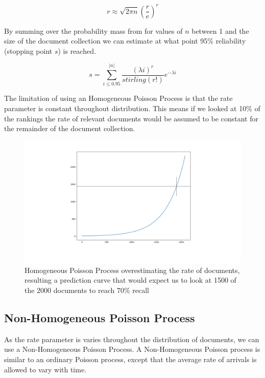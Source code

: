 \begin{equation}
	   r \approx \sqrt{2\pi n} \left( \frac{r}{e} \right) ^r
\end{equation}

By summing over the probability mass from for values of $n$ between 1 and the size of the document collection we can estimate at what point 95\% reliability (stopping point $s$) is reached. 

\begin{equation}
	   s = \sum_{i \leq 0.95}^{|n|} \frac{(\lambda i)^r}{stirling(r!)} e ^ {-\lambda i}
\end{equation}

The limitation of using an Homogeneous Poisson Process is that the rate parameter is constant throughout distribution. This means if we looked at 10\% of the rankings the rate of relevant documents would be assumed to be constant for the remainder of the document collection.


\begin{figure}[H]
\center
\includegraphics[width=16cm]{figures/overestimate.png}
\caption{Homogeneous Poisson Process overestimating the rate of documents, resulting a prediction curve that would expect us to look at 1500 of the 2000 documents to reach 70\% recall}
\end{figure}

\subsection{Non-Homogeneous Poisson Process}

As the rate parameter is varies throughout the distribution of documents, we can use a Non-Homogeneous Poisson Process. A Non-Homogeneous Poisson process is similar to an ordinary Poisson process, except that the average rate of arrivals is allowed to vary with time. 

